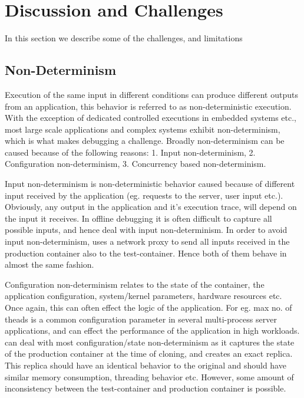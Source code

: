 \section{Discussion and Challenges}
\label{sec:challenges}

In this section we describe some of the challenges, and limitations 

\subsection{Non-Determinism}
\label{sec:nonDeterminism}

Execution of the same input in different conditions can produce different outputs from an application, this behavior is referred to as non-deterministic execution.
With the exception of dedicated controlled executions in embedded systems etc., most large scale applications and complex systems exhibit non-determinism, which is what makes debugging a challenge.
Broadly non-determinism can be caused because of the following reasons: 1. Input non-determinism, 2. Configuration non-determinism, 3. Concurrency based non-determinism.

Input non-determinism is non-deterministic behavior caused because of different input received by the application (eg. requests to the server, user input etc.). 
Obviously, any output in the application and it's execution trace, will depend on the input it receives. 
In offline debugging it is often difficult to capture all possible inputs, and hence deal with input non-determinism.
In order to avoid input non-determinism, \parikshan uses a network proxy to send all inputs received in the production container also to the test-container. 
Hence both of them behave in almost the same fashion.

Configuration non-determinism relates to the state of the container, the application configuration, system/kernel parameters, hardware resources etc.
Once again, this can often effect the logic of the application.
For eg. max no. of theads is a common configuration parameter in several multi-process server applications, and can effect the performance of the application in high workloads.
\parikshan can deal with most configuration/state non-determinism as it captures the state of the production container at the time of cloning, and creates an exact replica.
This replica should have an identical behavior to the original and should have similar memory consumption, threading behavior etc. 
However, some amount of inconsistency between the test-container and production container is possible.

